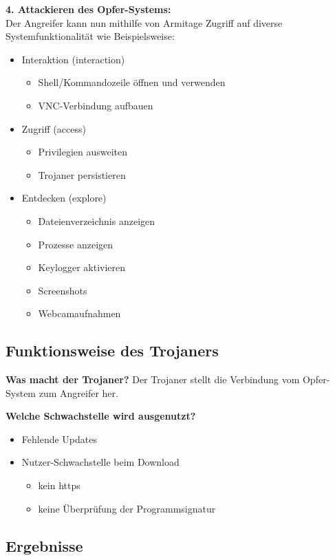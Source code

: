 \textbf{4. Attackieren des Opfer-Systems: } \hfill \\
Der Angreifer kann nun mithilfe von Armitage Zugriff auf diverse Systemfunktionalität wie Beispielsweise:
\begin{itemize}
	\item Interaktion (interaction)
		\begin{itemize}
			\item Shell/Kommandozeile öffnen und verwenden
			\item VNC-Verbindung aufbauen
		\end{itemize}
	\item Zugriff (access)
		\begin{itemize}
			\item Privilegien ausweiten
			\item Trojaner persistieren
		\end{itemize}
	\item Entdecken (explore)
		\begin{itemize}
			\item Dateienverzeichnis anzeigen
			\item Prozesse anzeigen
			\item Keylogger aktivieren
			\item Screenshots
			\item Webcamaufnahmen 
		\end{itemize}
\end{itemize}

\subsection{Funktionsweise des Trojaners}\label{sec:praktischeDurchfuehrung-funktionsweise}
\textbf{Was macht der Trojaner? }
Der Trojaner stellt die Verbindung vom Opfer-System zum Angreifer her.

\textbf{Welche Schwachstelle wird ausgenutzt? }
\begin{itemize}
	\item Fehlende Updates
	\item Nutzer-Schwachstelle beim Download
		\begin{itemize}
			\item kein https
			\item keine Überprüfung der Programmsignatur
		\end{itemize}
\end{itemize}

\subsection{Ergebnisse}\label{sec:praktischeDurchfuehrung-ergebnisse}

